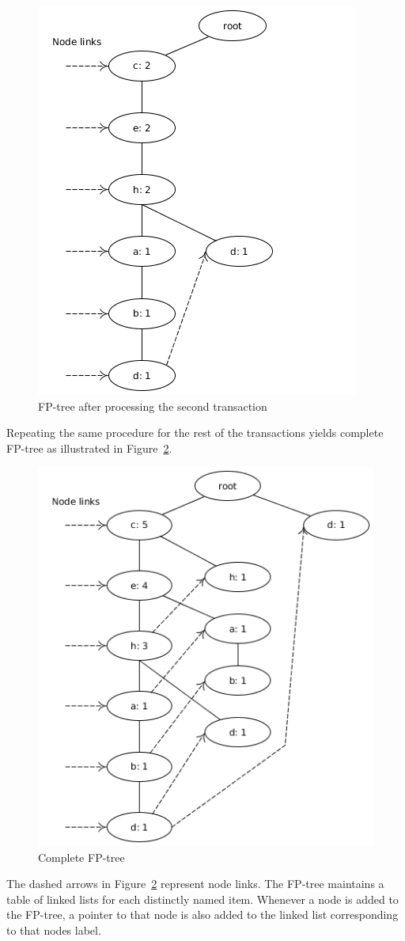\begin{figure}[!htbp]
	\centering
	\includegraphics[scale=0.5]{fp-tree-example/fp-tree-p2.png}
	\caption{FP-tree after processing the second transaction}
	\label{figure:fp-growth-example2}
\end{figure}

Repeating the same procedure for the rest of the transactions yields complete FP-tree as illustrated in Figure~\ref{figure:fp-growth-example3}.

\begin{figure}[!htbp]
	\centering
	\includegraphics[scale=0.5]{fp-tree-example/fp-tree-p3.png}
	\caption{Complete FP-tree}
	\label{figure:fp-growth-example3}
\end{figure}

The dashed arrows in Figure~\ref{figure:fp-growth-example3} represent node links. The FP-tree maintains a table of linked lists for each distinctly named item. Whenever a node is added to the FP-tree, a pointer to that node is also added to the linked list corresponding to that nodes label.

 